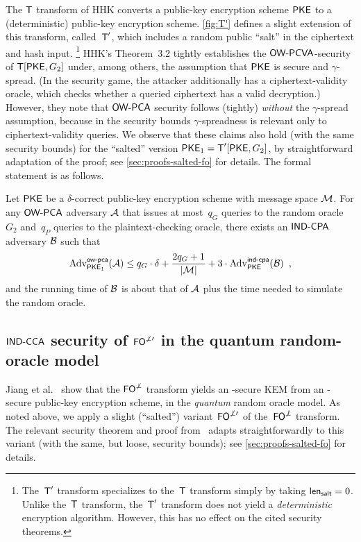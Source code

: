 \documentclass{iacrcc}
\begin{document}
The $\textsf{\upshape\mdseries T}$ transform of HHK converts a public-key encryption scheme $\textsf{\upshape\mdseries PKE}$ to a (deterministic) public-key encryption scheme. \autoref{fig:T'} defines a slight extension of this transform, called~$\textsf{\upshape\mdseries T}'$, which includes a random public ``salt'' in the ciphertext and hash input.%
\footnote{The~$\textsf{\upshape\mdseries T}'$ transform specializes to the~$\textsf{\upshape\mdseries T}$ transform simply by taking ${\mathsf{len}_{{\mathsf{salt}}}} = 0$.
  Unlike the~$\textsf{\upshape\mdseries T}$ transform, the~$\textsf{\upshape\mdseries T}'$ transform does not yield a \emph{deterministic} encryption algorithm.
  However, this has no effect on the cited security theorems.}
HHK's Theorem~3.2 tightly establishes the $\textsf{\upshape\mdseries OW-PCVA}$-security of $\textsf{\upshape\mdseries T}[\textsf{\upshape\mdseries PKE}, G_{2}]$ under, among others, the assumption that $\textsf{\upshape\mdseries PKE}$ is \INDCPA secure and $\gamma$-spread.
(In the \OWPCVA security game, the attacker additionally has a ciphertext-validity oracle, which checks whether a queried ciphertext has a valid decryption.)
However, they note that $\textsf{\upshape\mdseries OW-PCA}$ security follows (tightly) \emph{without} the $\gamma$-spread assumption, because in the security bounds $\gamma$-spreadness is relevant only to ciphertext-validity queries.
We observe that these claims also hold (with the same security bounds) for the ``salted'' version $\textsf{\upshape\mdseries PKE}_1 = \textsf{\upshape\mdseries T}'[\textsf{\upshape\mdseries PKE}, G_{2}]$, by straightforward adaptation of the proof; see \autoref{sec:proofs-salted-fo} for details.
The formal statement is as follows.

\begin{lemma}
  \label{lem:T'}
  Let $\textsf{\upshape\mdseries PKE}$ be a $\delta$-correct public-key encryption scheme with
  message space $\mathcal{M}$. For any $\textsf{\upshape\mdseries OW-PCA}$ adversary $\mathcal{A}$ that
  issues at most~$q_G$ queries to the random oracle~$G_2$ and~$q_P$
  queries to the plaintext-checking oracle, there exists an $\textsf{\upshape\mdseries IND-CPA}$
  adversary $\mathcal{B}$ such that
  \[
  \mathrm{Adv}^{\textsf{\upshape\mdseries \textsf{\upshape\mdseries ow-pca}}}_{\textsf{\upshape\mdseries PKE}_1}(\mathcal{A}) \leq q_G \cdot \delta + \frac{2 q_G
    + 1}{|\mathcal{M}|} + 3 \cdot \mathrm{Adv}^{\textsf{\upshape\mdseries \textsf{\upshape\mdseries ind-cpa}}}_{\textsf{\upshape\mdseries PKE}}(\mathcal{B}) \enspace
  ,
  \]
  and the running time of $\mathcal{B}$ is about that of $\mathcal{A}$
  plus the time needed to simulate the random oracle.
\end{lemma}

\subsection{$\textsf{\upshape\mdseries IND-CCA}$ security of $\textsf{\upshape\mdseries FO}^{\not\perp\prime}$ in the quantum random-oracle model}\label{sec:security:QROM}

Jiang et al.~\cite{C:JZCWM18} show that the $\textsf{\upshape\mdseries FO}^{\not\perp}$ transform yields an \INDCCA-secure KEM from an \OWCPA-secure public-key encryption scheme, in the \emph{quantum} random oracle model.
As noted above, we apply a slight (``salted'') variant~$\textsf{\upshape\mdseries FO}^{\not\perp\prime}$ of the~$\textsf{\upshape\mdseries FO}^{\not\perp}$ transform.
The relevant security theorem and proof from~\cite{C:JZCWM18} adapts straightforwardly to this variant (with the same, but loose, security bounds); see \autoref{sec:proofs-salted-fo} for details.
\end{document}
